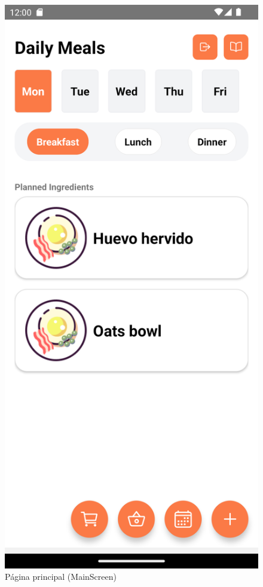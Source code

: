 \documentclass[twoside, openright, 11pt]{report}
\begin{document}
					\begin{figure}[H]
						\centering
						\includegraphics[scale=0.2]{imagenes/MainScreenScreenshot.png}
						\caption{Página principal (MainScreen)}
						\label{fig:MainScreen}
					\end{figure}
			
\end{document}
